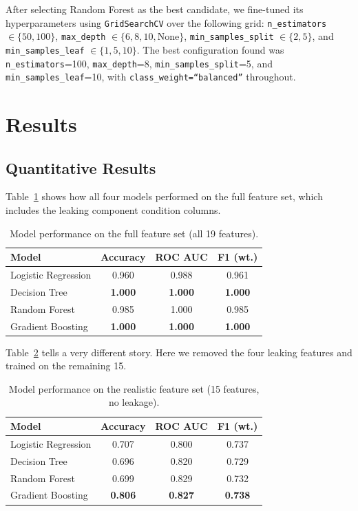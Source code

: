 \documentclass[conference]{IEEEtran}
\begin{document}
After selecting Random Forest as the best candidate, we fine-tuned its hyperparameters using \texttt{GridSearchCV} over the following grid: \texttt{n\_estimators} $\in \{50, 100\}$, \texttt{max\_depth} $\in \{6, 8, 10, \text{None}\}$, \texttt{min\_samples\_split} $\in \{2, 5\}$, and \texttt{min\_samples\_leaf} $\in \{1, 5, 10\}$. The best configuration found was \texttt{n\_estimators}=100, \texttt{max\_depth}=8, \texttt{min\_samples\_split}=5, and \texttt{min\_samples\_leaf}=10, with \texttt{class\_weight=``balanced''} throughout.

\section{Results}

\subsection{Quantitative Results}

Table~\ref{tab:full} shows how all four models performed on the full feature set, which includes the leaking component condition columns.

\begin{table}[H]
\centering
\caption{Model performance on the full feature set (all 19 features).}
\label{tab:full}
\begin{tabular}{lccc}
\toprule
Model & Accuracy & ROC AUC & F1 (wt.) \\
\midrule
Logistic Regression & 0.960 & 0.988 & 0.961 \\
Decision Tree & \textbf{1.000} & \textbf{1.000} & \textbf{1.000} \\
Random Forest & 0.985 & 1.000 & 0.985 \\
Gradient Boosting & \textbf{1.000} & \textbf{1.000} & \textbf{1.000} \\
\bottomrule
\end{tabular}
\end{table}

Table~\ref{tab:realistic} tells a very different story. Here we removed the four leaking features and trained on the remaining 15.

\begin{table}[H]
\centering
\caption{Model performance on the realistic feature set (15 features, no leakage).}
\label{tab:realistic}
\begin{tabular}{lccc}
\toprule
Model & Accuracy & ROC AUC & F1 (wt.) \\
\midrule
Logistic Regression & 0.707 & 0.800 & 0.737 \\
Decision Tree & 0.696 & 0.820 & 0.729 \\
Random Forest & 0.699 & 0.829 & 0.732 \\
Gradient Boosting & \textbf{0.806} & \textbf{0.827} & \textbf{0.738} \\
\bottomrule
\end{tabular}
\end{table}
\end{document}
